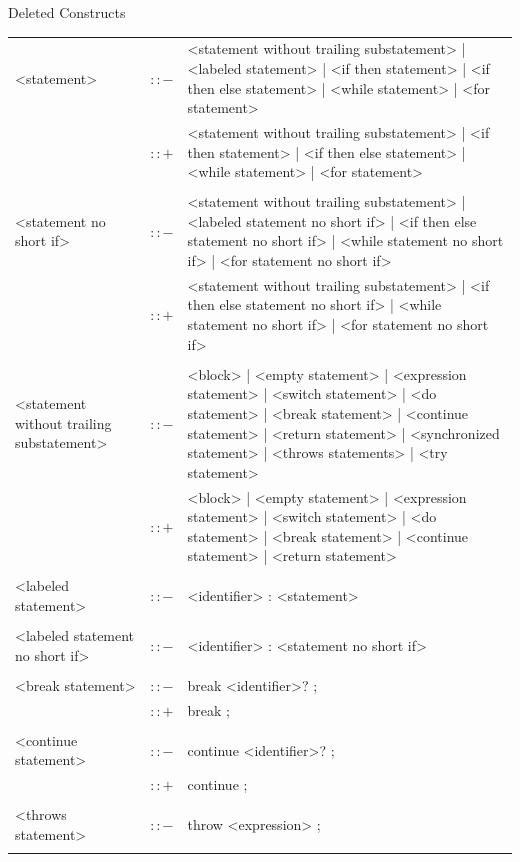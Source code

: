 \documentclass[landscape, 11pt]{article}
\begin{document}
\begin{qsection}{Deleted Constructs}
\begin{enumerate}[label=\bt{\theenumi.}]
			\begin{longtable}{R{7cm} c L{15cm}}
				<statement>									&	$\colon\colon-$	&	<statement without trailing substatement> | <labeled statement> | <if then statement> | <if then else statement> | <while statement> | <for statement> \\
															&	$\colon\colon+$	&	<statement without trailing substatement> | <if then statement> | <if then else statement> | <while statement> | <for statement> \\\\
				<statement no short if>						&	$\colon\colon-$	&	<statement without trailing substatement> | <labeled statement no short if> | <if then else statement no short if> | <while statement no short if> | <for statement no short if> \\
															&	$\colon\colon+$	&	<statement without trailing substatement> | <if then else statement no short if> | <while statement no short if> | <for statement no short if> \\\\
				<statement without trailing substatement>	&	$\colon\colon-$	&	<block> | <empty statement> | <expression statement> | <switch statement> | <do statement> | <break statement> | <continue statement> | <return statement> | <synchronized statement> | <throws statements> | <try statement> \\
															&	$\colon\colon+$	&	<block> | <empty statement> | <expression statement> | <switch statement> | <do statement> | <break statement> | <continue statement> | <return statement> \\\\
				<labeled statement>							&	$\colon\colon-$	&	<identifier> : <statement> \\\\
				<labeled statement no short if>				&	$\colon\colon-$	&	<identifier> : <statement no short if> \\\\
				<break statement>							&	$\colon\colon-$	&	break <identifier>? ; \\
															&	$\colon\colon+$	&	break ; \\\\
				<continue statement>						&	$\colon\colon-$	&	continue <identifier>? ; \\
															&	$\colon\colon+$	&	continue ; \\\\
				<throws statement>							&	$\colon\colon-$	&	throw <expression> ; \\\\

\end{longtable}
\end{enumerate}
\end{qsection}
\end{document}
